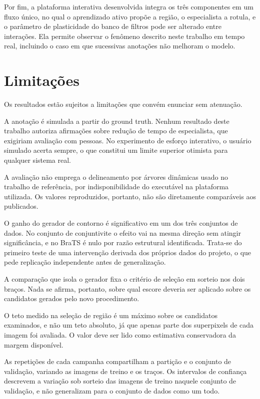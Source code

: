 Por fim, a plataforma interativa desenvolvida integra os três componentes em um fluxo único, no qual o aprendizado ativo propõe a região, o especialista a rotula, e o parâmetro de plasticidade do banco de filtros pode ser alterado entre interações. Ela permite observar o fenômeno descrito neste trabalho em tempo real, incluindo o caso em que sucessivas anotações não melhoram o modelo.

\section{Limitações}

Os resultados estão sujeitos a limitações que convém enunciar sem atenuação.

A anotação é simulada a partir do ground truth. Nenhum resultado deste trabalho autoriza afirmações sobre redução de tempo de especialista, que exigiriam avaliação com pessoas. No experimento de esforço interativo, o usuário simulado acerta sempre, o que constitui um limite superior otimista para qualquer sistema real.

A avaliação não emprega o delineamento por árvores dinâmicas usado no trabalho de referência, por indisponibilidade do executável na plataforma utilizada. Os valores reproduzidos, portanto, não são diretamente comparáveis aos publicados.

O ganho do gerador de contorno é significativo em um dos três conjuntos de dados. No conjunto de conjuntivite o efeito vai na mesma direção sem atingir significância, e no BraTS é nulo por razão estrutural identificada. Trata-se do primeiro teste de uma intervenção derivada dos próprios dados do projeto, o que pede replicação independente antes de generalização.

A comparação que isola o gerador fixa o critério de seleção em sorteio nos dois braços. Nada se afirma, portanto, sobre qual escore deveria ser aplicado sobre os candidatos gerados pelo novo procedimento.

O teto medido na seleção de região é um máximo sobre os candidatos examinados, e não um teto absoluto, já que apenas parte dos superpixels de cada imagem foi avaliada. O valor deve ser lido como estimativa conservadora da margem disponível.

As repetições de cada campanha compartilham a partição e o conjunto de validação, variando as imagens de treino e os traços. Os intervalos de confiança descrevem a variação sob sorteio das imagens de treino naquele conjunto de validação, e não generalizam para o conjunto de dados como um todo.

